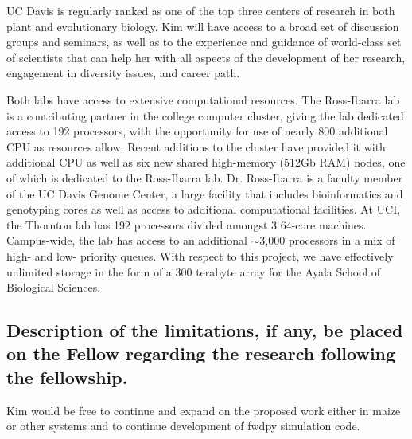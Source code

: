 UC Davis is regularly ranked as one of the top three centers of research in both plant and evolutionary biology.  Kim will have access to a broad set of discussion groups and seminars, as well as to the experience and guidance of world-class set of scientists that can help her with all aspects of the development of her research, engagement in diversity issues, and career path.

Both labs have access to extensive computational resources. The Ross-Ibarra lab is a contributing partner in the college  computer cluster, giving the lab dedicated access to 192 processors, with the opportunity for use of nearly 800 additional CPU as resources allow. Recent additions to the cluster have provided it with additional CPU as well as six new shared high-memory (512Gb RAM) nodes, one of which is dedicated to the Ross-Ibarra lab. Dr. Ross-Ibarra is a faculty member of the UC Davis Genome Center, a large facility that includes bioinformatics and genotyping cores as well as access to additional computational facilities.  At UCI, the Thornton lab has 192 processors divided amongst 3 64-core machines.  Campus-wide, the lab has access to an additional $\sim$3,000 processors in a mix of high- and low- priority queues.   With respect to this project, we have effectively unlimited storage in the form of a 300 terabyte array for the Ayala School of Biological Sciences.

\subsection{Description of the limitations, if any, be placed on the Fellow regarding the research following the fellowship.}
Kim would be free to continue and expand on the proposed work either in maize or other systems and to continue development of fwdpy simulation code.
%